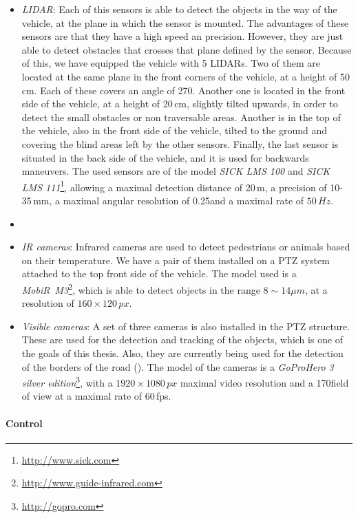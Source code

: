 \begin{itemize}
 \item \emph{\acf{LIDAR}}: Each of this sensors is able to detect the objects in the way of the vehicle, at the plane in which the sensor is mounted. The advantages of these sensors are that they have a high speed an precision. However, they are just able to detect obstacles that crosses that plane defined by the sensor. Because of this, we have equipped the vehicle with 5 \acp{LIDAR}. Two of them are located at the same plane in the front corners of the vehicle, at a height of 50\,cm. Each of these covers an angle of 270\textdegree. Another one is located in the front side of the vehicle, at a height of 20\,cm, slightly tilted upwards, in order to detect the small obstacles or non traversable areas. Another is in the top of the vehicle, also in the front side of the vehicle, tilted to the ground and covering the blind areas left by the other sensors. Finally, the last sensor is situated in the back side of the vehicle, and it is used for backwards maneuvers. The used sensors are of the model \emph{SICK LMS 100} and \emph{SICK LMS 111}\footnote{\url{http://www.sick.com}}, allowing a maximal detection distance of 20\,m, a precision of 10-35\,mm, a maximal angular resolution of 0.25\textdegree and a maximal rate of $50\,Hz$.
 \item {}
 \item \emph{IR cameras}: Infrared cameras are used to detect pedestrians or animals based on their temperature. We have a pair of them installed on a \ac{PTZ} system attached to the top front side of the vehicle. The model used is a \emph{MobiR\textregistered~M3}\footnote{\url{http://www.guide-infrared.com}}, which is able to detect objects in the range $8\sim14\mu m$, at a resolution of $160 \times 120\,px$.
 \item \emph{Visible cameras}: A set of three cameras is also installed in the \ac{PTZ} structure. These are used for the detection and tracking of the objects, which is one of the goals of this thesis. Also, they are currently being used for the detection of the borders of the road (\cite{arnay2009applying}). The model of the cameras is a \emph{GoPro\textregistered Hero 3 silver edition}\footnote{\url{http://gopro.com}}, with a $1920 \times 1080 \, px$ maximal video resolution and a 170\textdegree field of view at a maximal rate of 60\,fps.
\end{itemize}

\paragraph{Control}\label{ch:chapter00_03_00_00_03}

